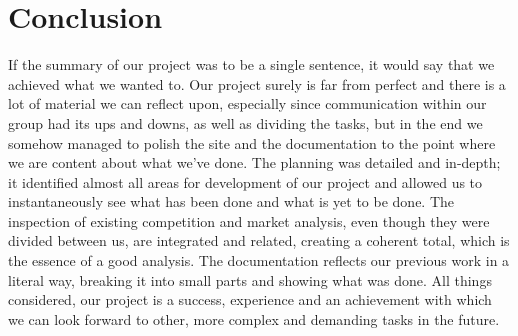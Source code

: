 \documentclass[12p]{article}
\begin{document}
\section{Conclusion}
If the summary of our project was to be a single sentence, it would say that we achieved what we wanted to. Our project surely is far from perfect and there is a lot of material we can reflect upon, especially since communication within our group had its ups and downs, as well as dividing the tasks, but in the end we somehow managed to polish the site and the documentation to the point where we are content about what we’ve done. The planning was detailed and in-depth; it identified almost all areas for development of our project and allowed us to instantaneously see what has been done and what is yet to be done. The inspection of existing competition and market analysis, even though they were divided between us, are integrated and related, creating a coherent total, which is the essence of a good analysis. The documentation reflects our previous work in a literal way, breaking it into small parts and showing what was done. All things considered, our project is a success, experience and an achievement with which we can look forward to other, more complex and demanding tasks in the future.

\newpage
\printbibliography[heading=bibintoc,title={References}]



\end{document}
